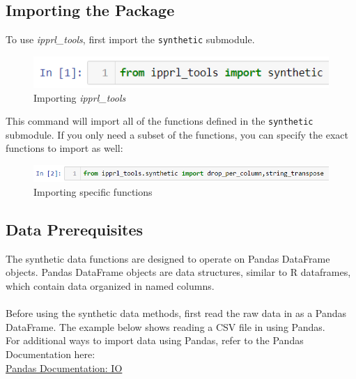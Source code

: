 \documentclass[titlepage, 11pt]{article}
\newcommand{\pkgname}{\textit{ipprl\_tools}}
\begin{document}
\subsection{Importing the Package}
To use \pkgname{}, first import the \verb|synthetic| submodule. 
\begin{figure}[H]
    \centering
    \includegraphics{imgs/Import}
    \caption{Importing \pkgname{}}
    \label{fig:my_label}
\end{figure}

\noindent This command will import all of the functions defined in the \verb|synthetic| submodule. If you only need a subset of the functions, you can specify the exact functions to import as well:

\begin{figure}[H]
    \centering
    \includegraphics{imgs/Import2}
    \caption{Importing specific functions}
    \label{fig:my_label}
\end{figure}

\subsection{Data Prerequisites}
The synthetic data functions are designed to operate on Pandas DataFrame objects. Pandas DataFrame objects are data structures, similar to R dataframes, which contain data organized in named columns. 
\\
\\
\noindent Before using the synthetic data methods, first read the raw data in as a Pandas DataFrame. The example below shows reading a CSV file in using Pandas.
\\
\noindent For additional ways to import data using Pandas, refer to the Pandas Documentation here:
\\
\href{https://pandas.pydata.org/pandas-docs/stable/user_guide/io.html}{Pandas Documentation: IO}
\\
\end{document}
